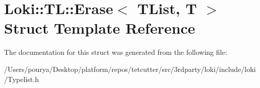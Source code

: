 \hypertarget{structLoki_1_1TL_1_1Erase}{}\section{Loki\+:\+:T\+L\+:\+:Erase$<$ T\+List, T $>$ Struct Template Reference}
\label{structLoki_1_1TL_1_1Erase}


The documentation for this struct was generated from the following file\+:\begin{DoxyCompactItemize}
\item 
/\+Users/pourya/\+Desktop/platform/repos/tetcutter/src/3rdparty/loki/include/loki/Typelist.\+h\end{DoxyCompactItemize}
